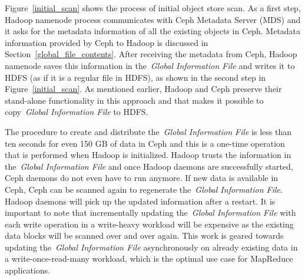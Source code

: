 \documentclass[preprint,12pt]{elsarticle}
\begin{document}
Figure~\ref{initial_scan} shows the process of initial object store scan. As a first step,
Hadoop namenode process communicates with Ceph Metadata Server (MDS) and it asks for the metadata
information of all the existing objects in Ceph. Metadata information provided by Ceph
to Hadoop is discussed in Section~\ref{global_file_contents}. After receiving the metadata from Ceph, Hadoop
namenode saves this information in the~\textit{Global Information File} and writes it
to HDFS (as if it is a regular file in HDFS), as shown in the second step in Figure~\ref{initial_scan}.
As mentioned earlier, Hadoop and Ceph preserve their stand-alone functionality in this
approach and that makes it possible to copy~\textit{Global Information File} to HDFS.

The procedure to create and distribute the~\textit{Global Information File} is less than ten seconds
for even 150 GB of data in Ceph and this is a one-time operation that is performed when Hadoop is initialized.
Hadoop trusts the information in the~\textit{Global Information File} and once Hadoop daemons are successfully
started, Ceph daemons do not even have to run anymore. If new data is available in Ceph, Ceph can be scanned
again to regenerate the~\textit{Global Information File}. Hadoop daemons will pick up the updated
information after a restart. It is important to note that incrementally updating the~\textit{Global Information File}
with each write operation in a write-heavy workload will be expensive as the existing data blocks will be scanned over and over
again. This work is geared towards updating the~\textit{Global Information File} asynchronously on already existing
data in a write-once-read-many workload, which is the optimal use case for MapReduce applications.
\end{document}

